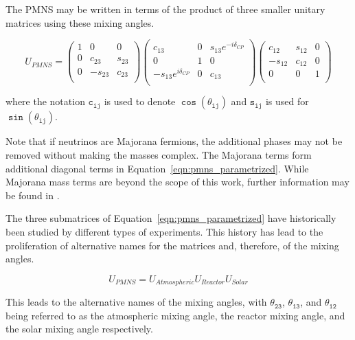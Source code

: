 The PMNS may be written in terms of the product of three smaller unitary matrices using these mixing angles.

\begin{equation}
U_{PMNS} = 
\begin{pmatrix}
1 & 0 & 0 \\
0 & c_{23} & s_{23} \\
0 & -s_{23} & c_{23} \\
\end{pmatrix}
\begin{pmatrix}
c_{13} & 0 & s_{13} e^{-i\delta_{CP}} \\
0 & 1 & 0 \\
-s_{13} e^{i \delta_{CP}} & 0 & c_{13} \\
\end{pmatrix}
\begin{pmatrix}
c_{12} & s_{12} & 0 \\
-s_{12} & c_{12} & 0 \\
0 & 0 & 1 \\
\end{pmatrix}
\label{eqn:pmns_parametrized}
\end{equation}

where the notation $\mathtt{c_{ij}}$ is used to denote $\mathtt{\cos\left(\theta_{ij}\right)}$ and $\mathtt{s_{ij}}$ is used for $\mathtt{\sin\left(\theta_{ij}\right)}$.

Note that if neutrinos are Majorana fermions, the additional phases may not be removed without making the masses complex.
The Majorana terms form additional diagonal terms in Equation~\ref{eqn:pmns_parametrized}.
While Majorana mass terms are beyond the scope of this work, further information may be found in \cite{Review-PMNS,Review-MajoranaNu}.

The three submatrices of Equation~\ref{eqn:pmns_parametrized} have historically been studied by different types of experiments. 
This history has lead to the proliferation of alternative names for the matrices and, therefore, of the mixing angles.

\begin{equation}
U_{PMNS} = U_{Atmospheric} U_{Reactor} U_{Solar}
\end{equation}

This leads to the alternative names of the mixing angles, with $\mathtt{\theta_{23}}$, $\mathtt{\theta_{13}}$, and $\mathtt{\theta_{12}}$ being referred to as the atmospheric mixing angle, the reactor mixing angle, and the solar mixing angle respectively.

